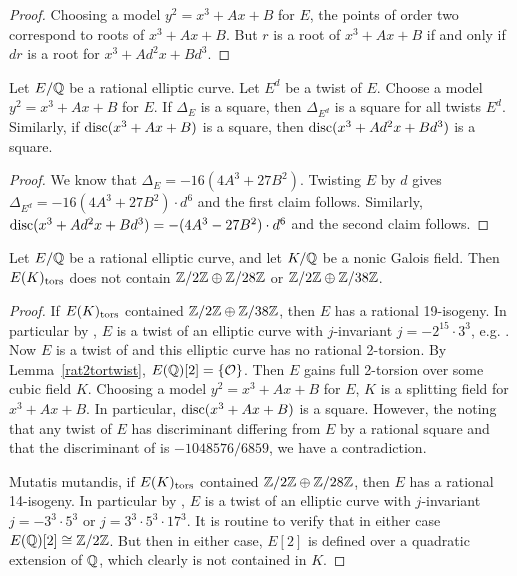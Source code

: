 \begin{proof} 
Choosing a model $y^2= x^3 + Ax + B$ for $E$, the points of order two correspond to roots of $x^3 + Ax + B$. But $r$ is a root of $x^3 + Ax + B$ if and only if $dr$ is a root for $x^3 + Ad^2x + Bd^3$. 
\end{proof}


\begin{lem} \label{twistsquare}
Let $E/\mathbb{Q}$ be a rational elliptic curve. Let $E^d$ be a twist of $E$. Choose a model $y^2= x^3 + Ax + B$ for $E$. If $\Delta_E$ is a square, then $\Delta_{E^d}$ is a square for all twists $E^d$. Similarly, if $\operatorname{disc}(x^3 + Ax + B)$ is a square, then $\operatorname{disc}(x^3 + Ad^2x + Bd^3)$ is a square. 
\end{lem}

\begin{proof}
We know that $\Delta_E= -16(4A^3 + 27B^2)$. Twisting $E$ by $d$ gives $\Delta_{E^d}= -16(4A^3 + 27B^2) \cdot d^6$ and the first claim follows. Similarly, $\operatorname{disc}(x^3 + Ad^2x + Bd^3)= -(4A^3 - 27B^2) \cdot d^6$ and the second claim follows. 
\end{proof}


\begin{lem} \label{no28-38}
Let $E/\mathbb{Q}$ be a rational elliptic curve, and let $K/\mathbb{Q}$ be a nonic Galois field. Then $E(K)_{\text{tors}}$ does not contain $\mathbb{Z}/2\mathbb{Z} \oplus \mathbb{Z}/28\mathbb{Z}$ or $\mathbb{Z}/2\mathbb{Z} \oplus \mathbb{Z}/38\mathbb{Z}$.
\end{lem}

\begin{proof}
If $E(K)_{\text{tors}}$ contained $\mathbb{Z}/2\mathbb{Z} \oplus \mathbb{Z}/38\mathbb{Z}$, then $E$ has a rational 19-isogeny. In particular by \cite[Table~4]{lozanorobledo13}, $E$ is a twist of an elliptic curve with $j$-invariant $j= -2^{15} \cdot 3^3$, e.g. \tsoao{}. Now $E$ is a twist of \tsoao{} and this elliptic curve has no rational 2-torsion. By Lemma~\ref{rat2tortwist}, $E(\mathbb{Q})[2]= \{ \mathcal{O} \}$. Then $E$ gains full 2-torsion over some cubic field $K$. Choosing a model $y^2= x^3 + Ax + B$ for $E$, $K$ is a splitting field for $x^3 + Ax + B$. In particular, $\operatorname{disc}(x^3 + Ax + B)$ is a square. However, the noting that any twist of $E$ has discriminant differing from $E$ by a rational square and that the discriminant of \tsoao{} is $-1048576/6859$, we have a contradiction. 

Mutatis mutandis, if $E(K)_{\text{tors}}$ contained $\mathbb{Z}/2\mathbb{Z} \oplus \mathbb{Z}/28\mathbb{Z}$, then $E$ has a rational 14-isogeny. In particular by \cite[Table~4]{lozanorobledo13}, $E$ is a twist of an elliptic curve with $j$-invariant $j= -3^3 \cdot 5^3$ or $j= 3^3 \cdot 5^3 \cdot 17^3$. It is routine to verify that in either case $E(\mathbb{Q})[2] \cong \mathbb{Z}/2\mathbb{Z}$. But then in either case, $E[2]$ is defined over a quadratic extension of $\mathbb{Q}$, which clearly is not contained in $K$. 
\end{proof}



